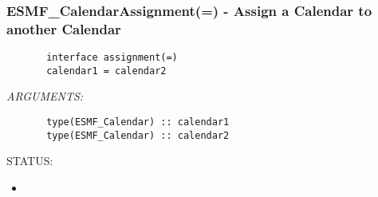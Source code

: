  
\setlength{\oldparskip}{\parskip}
\setlength{\parskip}{1.5ex}
\setlength{\oldparindent}{\parindent}
\setlength{\parindent}{0pt}
\setlength{\oldbaselineskip}{\baselineskip}
\setlength{\baselineskip}{11pt}
 
\def\bv{\begin{verbatim}}
\def\ev{\end{verbatim}}
\def\be{\begin{equation}}
\def\ee{\end{equation}}
\def\bea{\begin{eqnarray}}
\def\eea{\end{eqnarray}}
\def\bi{\begin{itemize}}
\def\ei{\end{itemize}}
\def\bn{\begin{enumerate}}
\def\en{\end{enumerate}}
\def\bd{\begin{description}}
\def\ed{\end{description}}
\def\({\left (}
\def\){\right )}
\def\[{\left [}
\def\]{\right ]}
\def\<{\left  \langle}
\def\>{\right \rangle}
\def\cI{{\cal I}}
\def\diag{\mathop{\rm diag}}
\def\tr{\mathop{\rm tr}}


 
\subsubsection [ESMF\_CalendarAssignment(=)] {ESMF\_CalendarAssignment(=) - Assign a Calendar to another Calendar}


  
\begin{verbatim}       interface assignment(=)
       calendar1 = calendar2\end{verbatim}{\em ARGUMENTS:}
\begin{verbatim}       type(ESMF_Calendar) :: calendar1
       type(ESMF_Calendar) :: calendar2
   \end{verbatim}
{\sf STATUS:}
   \begin{itemize}
   \item{}
   \end{itemize}
  
